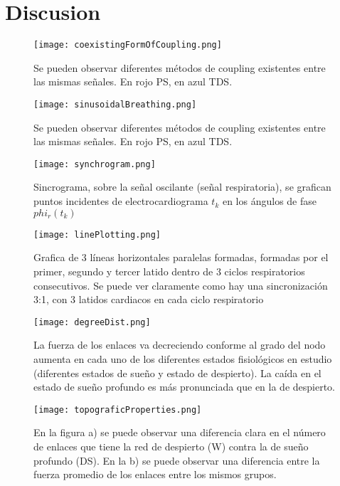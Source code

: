 \documentclass[twoside,twocolumn]{article}
\begin{document}
\section{Discusion}

\renewcommand\refname{Referencias}
\printbibliography
\begin{figure}
  \texttt{[image: coexistingFormOfCoupling.png]}
  \caption{Se pueden observar diferentes métodos de coupling existentes entre las mismas señales. En rojo PS, en azul TDS.}
  \label{fig:coexistingFormOfCoupling}
\end{figure}
\begin{figure}
  \texttt{[image: sinusoidalBreathing.png]}
  \caption{Se pueden observar diferentes métodos de coupling existentes entre las mismas señales. En rojo PS, en azul TDS.}
  \label{fig:sinusoidalBreathing}
\end{figure}
\begin{figure}
  \texttt{[image: synchrogram.png]}
  \caption{Sincrograma, sobre la señal oscilante (señal respiratoria), se grafican puntos incidentes de electrocardiograma $t_k$ en los ángulos de fase $phi_r(t_k)$}
  \label{fig:synchrogram}
\end{figure}
\begin{figure}
  \texttt{[image: linePlotting.png]}
  \caption{Grafica de 3 líneas horizontales paralelas formadas, formadas por el primer, segundo y tercer latido dentro de 3 ciclos respiratorios consecutivos. Se puede ver claramente como hay una sincronización 3:1, con 3 latidos cardiacos en cada ciclo respiratorio}
  \label{fig:linePlotting}
\end{figure}
\begin{figure}
  \texttt{[image: degreeDist.png]}
  \caption{La fuerza de los enlaces va decreciendo conforme al grado del nodo aumenta en cada uno de los diferentes estados fisiológicos en estudio (diferentes estados de sueño y estado de despierto). La caída en el estado de sueño profundo es más pronunciada que en la de despierto.}
  \label{fig:degreeDist}
\end{figure}
\begin{figure}
  \texttt{[image: topograficProperties.png]}
  \caption{En la figura a) se puede observar una diferencia clara en el número de enlaces que tiene la red de despierto (W) contra la de sueño profundo (DS). En la b) se puede observar una diferencia entre la fuerza promedio de los enlaces entre los mismos grupos.}
  \label{fig:topograficProperties}
\end{figure}
\end{document}
